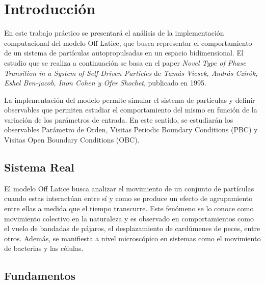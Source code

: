 \documentclass[11pt, a4paper]{article}
\begin{document}
    \section{Introducción}

        En este trabajo práctico se presentará el análisis de la implementación computacional del modelo Off Latice, que busca
        representar el comportamiento de un sistema de partículas autopropulsadas en un espacio bidimensional. El estudio que se
        realiza a continuación se basa en el paper \textit{Novel Type of Phase Transition in a System of Self-Driven Particles} de
        \textit{Tamás Vicsek, András Czirók, Eshel Ben-jacob, Inon Cohen y Ofer Shochet}, publicado en 1995.

        La implementación del modelo permite simular el sistema de partículas y definir observables que permiten estudiar el
        comportamiento del mismo en función de la variación de los parámetros de entrada. En este sentido, se estudiarán los
        observables Parámetro de Orden, Visitas Periodic Boundary Conditions (PBC) y Visitas Open Boundary Conditions (OBC).

        \subsection{Sistema Real}


            El modelo Off Latice busca analizar el movimiento de un conjunto de partículas cuando estas interactúan entre sí y
            como se produce un efecto de agrupamiento entre ellas a medida que el tiempo transcurre. Este fenómeno se lo conoce
            como movimiento colectivo en la naturaleza y es observado en comportamientos como el vuelo de bandadas de pájaros,
            el desplazamiento de cardúmenes de peces, entre otros. Además, se manifiesta a nivel microscópico en sistemas como
            el movimiento de bacterias y las células.

        \subsection{Fundamentos}
\end{document}
